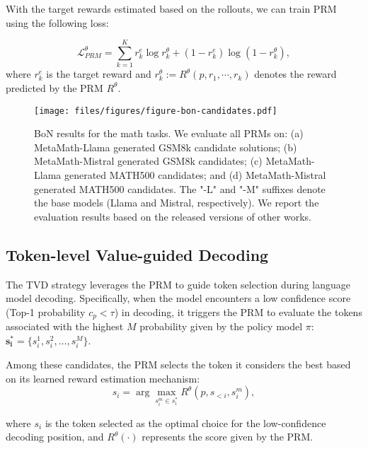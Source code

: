 With the target rewards estimated based on the rollouts, we can train PRM using the following loss:

\begin{equation}
    \mathcal{L}_{PRM}^\theta = \sum_{k=1}^K r_k^e \log r_k^\theta+ (1 - r_k^e) \log (1 - r_k^\theta),
    \label{eq:prm_loss}
\end{equation}
where $r_k^e$ is the target reward and $r_k^\theta := R^\theta(p, r_1, \cdots, r_k)$ denotes the reward predicted by the PRM $R^\theta$.

\begin{figure*}[htbp]
    \centering
    
    \texttt{[image: files/figures/figure-bon-candidates.pdf]} %

    \caption{BoN results for the math tasks. We evaluate all PRMs on: (a) MetaMath-Llama generated GSM8k candidate solutions; (b) MetaMath-Mistral generated GSM8k candidates; (c) MetaMath-Llama generated MATH500 candidates; and (d) MetaMath-Mistral generated MATH500 candidates. The "-L" and "-M" suffixes denote the base models (Llama and Mistral, respectively). We report the evaluation results based on the released versions of other works.}
    \label{fig:bon_main}
\end{figure*}

\subsection{Token-level Value-guided Decoding}

The TVD strategy leverages the PRM to guide token selection during language model decoding. Specifically, when the model encounters a low confidence score (Top-1 probability $c_p < \tau$) in decoding, it triggers the PRM to evaluate the tokens associated with the highest $M$ probability given by the policy model $\pi$: $\mathbf{s_i^*}=\{s_i^1,s_i^2,\dots,s_i^M\}$.

Among these candidates, the PRM selects the token it considers the best based on its learned reward estimation mechanism: 
\begin{equation}
s_i=\arg \max _{s_i^m \in s_i^*} R^\theta\left(p, s_{<i},s_i^m\right),
\end{equation}

where $s_i$ is the token selected as the optimal choice for the low-confidence decoding position, and $R^\theta(\cdot)$ represents the score given by the PRM.

